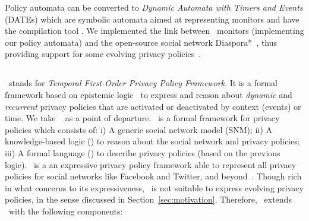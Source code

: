 Policy automata can be converted to \emph{Dynamic Automata with Timers and Events} (DATEs) \cite{CPS08lrt} which are symbolic automata aimed at representing monitors and have the compilation tool \larva. We implemented the link between \larva~monitors (implementing our policy automata) and the open-source social network Diaspora*~\cite{DiasporaWeb}, thus providing support for some evolving privacy policies~\cite{ppfDiaspora}.
\vspace{-1mm}
\subsection{\tfppf}

\tfppf~stands for {\em Temporal First-Order Privacy Policy Framework}.
It is a formal framework based on epistemic logic~\cite{FHM+95rk} to express and reason about {\em dynamic} and {\em recurrent} privacy policies that are activated or deactivated by context (events) or time. We take \fppf~\cite{PS14fpp} as a point of departure. \fppf~is a formal framework for privacy policies which consists of:
i) A generic social network model (SNM);
ii) A knowledge-based logic (\kbl) to reason about the social network and privacy policies;
iii) A formal language (\ppl) to describe privacy policies (based on the previous logic).
\fppf~is a an expressive privacy policy framework able to represent all privacy policies for social networks like Facebook and Twitter, and beyond~\cite{PS14fpp}. Though rich in what concerns to its expressiveness, \fppf~is not suitable to express evolving privacy policies, in the sense discussed in Section~\ref{sec:motivation}. Therefore, \tfppf~extends \fppf~with the following components:

